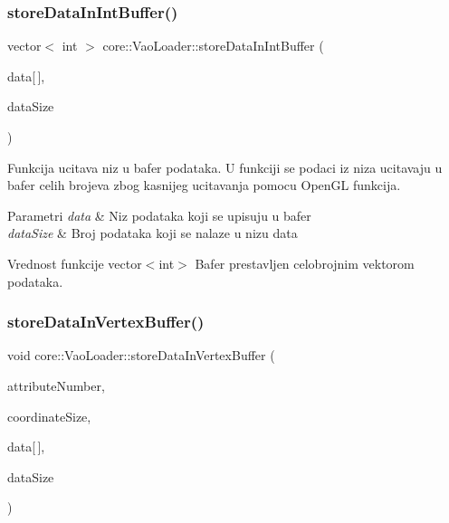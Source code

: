 \subsubsection{\texorpdfstring{store\+Data\+In\+Int\+Buffer()}{storeDataInIntBuffer()}}
{\footnotesize\ttfamily vector$<$ int $>$ core\+::\+Vao\+Loader\+::store\+Data\+In\+Int\+Buffer (\begin{DoxyParamCaption}\item[{G\+Lint}]{data\mbox{[}$\,$\mbox{]},  }\item[{G\+Lint}]{data\+Size }\end{DoxyParamCaption})\hspace{0.3cm}{\ttfamily [private]}}



Funkcija ucitava niz u bafer podataka. U funkciji se podaci iz niza ucitavaju u bafer celih brojeva zbog kasnijeg ucitavanja pomocu Open\+GL funkcija. 


\begin{DoxyParams}{Parametri}
{\em data} & Niz podataka koji se upisuju u bafer \\
\hline
{\em data\+Size} & Broj podataka koji se nalaze u nizu data \\
\hline
\end{DoxyParams}
\begin{DoxyReturn}{Vrednost funkcije}
vector$<$int$>$ Bafer prestavljen celobrojnim vektorom podataka. 
\end{DoxyReturn}
\mbox{\label{classcore_1_1VaoLoader_a234b87947a46ffcaea7dc6de09185a41}} 
\subsubsection{\texorpdfstring{store\+Data\+In\+Vertex\+Buffer()}{storeDataInVertexBuffer()}}
{\footnotesize\ttfamily void core\+::\+Vao\+Loader\+::store\+Data\+In\+Vertex\+Buffer (\begin{DoxyParamCaption}\item[{G\+Lint}]{attribute\+Number,  }\item[{int}]{coordinate\+Size,  }\item[{G\+Lfloat}]{data\mbox{[}$\,$\mbox{]},  }\item[{G\+Lint}]{data\+Size }\end{DoxyParamCaption})\hspace{0.3cm}{\ttfamily [private]}}



